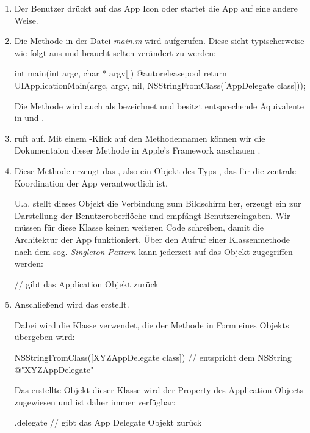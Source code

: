 \documentclass[parskip=half, final]{scrreprt}
\begin{document}
\begin{enumerate}
\item Der Benutzer drückt auf das App Icon oder startet die App auf eine andere Weise.
\item Die Methode  in der Datei \emph{main.m} wird aufgerufen. Diese sieht typischerweise wie folgt aus und braucht selten verändert zu werden:

\begin{objclst}
int main(int argc, char * argv[])
{
    @autoreleasepool {
        return UIApplicationMain(argc, argv, nil, NSStringFromClass([AppDelegate class]));
    }
}
\end{objclst}

Die  Methode wird auch als  bezeichnet und besitzt entsprechende Äquivalente in  und .

\item {} ruft  auf. Mit einem \keys{\altkey}-Klick auf den Methodennamen können wir die Dokumentaion dieser Methode in Apple's  Framework anschauen .


\item Diese Methode erzeugt das , also ein Objekt des Typs , das für die zentrale Koordination der App verantwortlich ist.

U.a. stellt dieses Objekt die Verbindung zum Bildschirm her, erzeugt ein  zur Darstellung der Benutzeroberflöche und empfängt Benutzereingaben. Wir müssen für diese Klasse keinen weiteren Code schreiben, damit die Architektur der App funktioniert. Über den Aufruf einer Klassenmethode nach dem sog. \emph{Singleton Pattern}  kann jederzeit auf das  Objekt zugegriffen werden:

\begin{objclst}
 // gibt das Application Objekt zurück
\end{objclst}

\item Anschließend wird das  erstellt.

Dabei wird die Klasse verwendet, die der  Methode in Form eines  Objekts übergeben wird:
\begin{objclst}
NSStringFromClass([XYZAppDelegate class]) // entspricht dem NSString @"XYZAppDelegate"
\end{objclst}
Das erstellte Objekt dieser Klasse wird der Property  des Application Objects zugewiesen und ist daher immer verfügbar:
\begin{objclst}
.delegate // gibt das App Delegate Objekt zurück
\end{objclst}


\end{enumerate}
\end{document}
